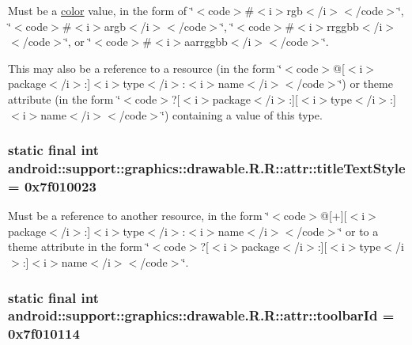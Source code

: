 Must be a \hyperlink{classandroid_1_1support_1_1graphics_1_1drawable_1_1_r_1_1color}{color} value, in the form of \char`\"{}$<$code$>$\#$<$i$>$rgb$<$/i$>$$<$/code$>$\char`\"{}, \char`\"{}$<$code$>$\#$<$i$>$argb$<$/i$>$$<$/code$>$\char`\"{}, \char`\"{}$<$code$>$\#$<$i$>$rrggbb$<$/i$>$$<$/code$>$\char`\"{}, or \char`\"{}$<$code$>$\#$<$i$>$aarrggbb$<$/i$>$$<$/code$>$\char`\"{}. 

This may also be a reference to a resource (in the form \char`\"{}$<$code$>$@\mbox{[}$<$i$>$package$<$/i$>$:\mbox{]}$<$i$>$type$<$/i$>$:$<$i$>$name$<$/i$>$$<$/code$>$\char`\"{}) or theme attribute (in the form \char`\"{}$<$code$>$?\mbox{[}$<$i$>$package$<$/i$>$:\mbox{]}\mbox{[}$<$i$>$type$<$/i$>$:\mbox{]}$<$i$>$name$<$/i$>$$<$/code$>$\char`\"{}) containing a value of this type. \hypertarget{classandroid_1_1support_1_1graphics_1_1drawable_1_1_r_1_1attr_a256795c7f8879fd01011ec56db3e0f3}{
\subsubsection[{titleTextStyle}]{\setlength{\rightskip}{0pt plus 5cm}static final int android::support::graphics::drawable.R.R::attr::titleTextStyle = 0x7f010023}}
\label{classandroid_1_1support_1_1graphics_1_1drawable_1_1_r_1_1attr_a256795c7f8879fd01011ec56db3e0f3}


Must be a reference to another resource, in the form \char`\"{}$<$code$>$@\mbox{[}+\mbox{]}\mbox{[}$<$i$>$package$<$/i$>$:\mbox{]}$<$i$>$type$<$/i$>$:$<$i$>$name$<$/i$>$$<$/code$>$\char`\"{} or to a theme attribute in the form \char`\"{}$<$code$>$?\mbox{[}$<$i$>$package$<$/i$>$:\mbox{]}\mbox{[}$<$i$>$type$<$/i$>$:\mbox{]}$<$i$>$name$<$/i$>$$<$/code$>$\char`\"{}. \hypertarget{classandroid_1_1support_1_1graphics_1_1drawable_1_1_r_1_1attr_6552aab8ccfd9eca38dfb147f4a0919e}{
\subsubsection[{toolbarId}]{\setlength{\rightskip}{0pt plus 5cm}static final int android::support::graphics::drawable.R.R::attr::toolbarId = 0x7f010114}}
\label{classandroid_1_1support_1_1graphics_1_1drawable_1_1_r_1_1attr_6552aab8ccfd9eca38dfb147f4a0919e}


